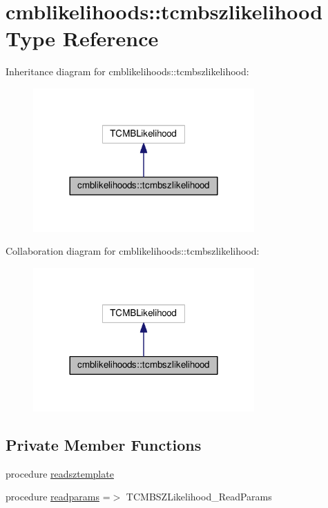 \hypertarget{structcmblikelihoods_1_1tcmbszlikelihood}{}\section{cmblikelihoods\+:\+:tcmbszlikelihood Type Reference}
\label{structcmblikelihoods_1_1tcmbszlikelihood}


Inheritance diagram for cmblikelihoods\+:\+:tcmbszlikelihood\+:
\nopagebreak
\begin{figure}[H]
\begin{center}
\leavevmode
\includegraphics[width=240pt]{structcmblikelihoods_1_1tcmbszlikelihood__inherit__graph}
\end{center}
\end{figure}


Collaboration diagram for cmblikelihoods\+:\+:tcmbszlikelihood\+:
\nopagebreak
\begin{figure}[H]
\begin{center}
\leavevmode
\includegraphics[width=240pt]{structcmblikelihoods_1_1tcmbszlikelihood__coll__graph}
\end{center}
\end{figure}
\subsection*{Private Member Functions}
\begin{DoxyCompactItemize}
\item 
procedure \mbox{\hyperlink{structcmblikelihoods_1_1tcmbszlikelihood_ae72cb577ffc417efa59274dc1bcaf100}{readsztemplate}}
\item 
procedure \mbox{\hyperlink{structcmblikelihoods_1_1tcmbszlikelihood_a4db5c38bc1d6c5e67be755992f6c43f3}{readparams}} =$>$ T\+C\+M\+B\+S\+Z\+Likelihood\+\_\+\+Read\+Params
\end{DoxyCompactItemize}
